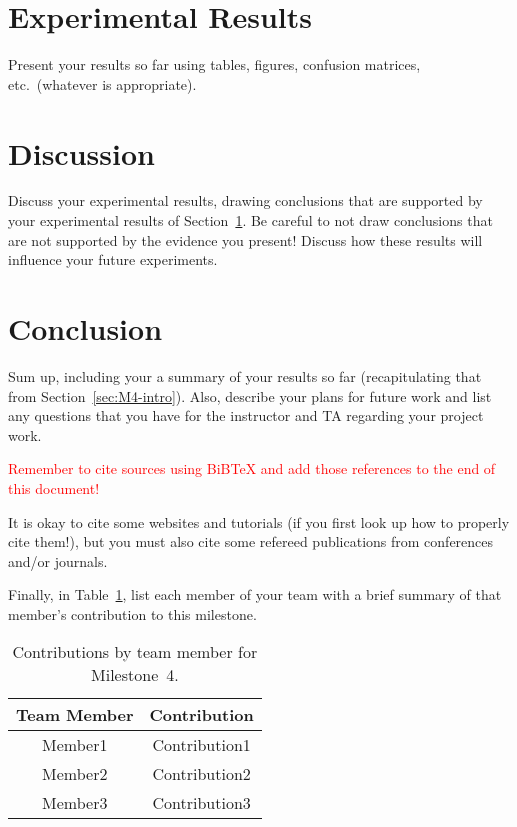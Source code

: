 \documentclass{report}
\begin{document}
\section{Experimental Results}
\label{sec:M4-results}

Present your results so far using tables, figures, confusion matrices, etc.\ (whatever is appropriate). 

\section{Discussion}

Discuss your experimental results, drawing conclusions that are supported by your experimental results of Section~\ref{sec:M4-results}.  Be careful to not draw conclusions that are not supported by the evidence you present! Discuss how these results will influence your future experiments.

\section{Conclusion}

Sum up, including your a summary of your results so far (recapitulating that from Section~\ref{sec:M4-intro}).  Also, describe your plans for future work and list any questions that you have for the instructor and TA regarding your project work.

\textcolor{red}{Remember to cite sources using BiBTeX and add those references to the end of this document!}

It is okay to cite some websites and tutorials (if you first look up how to properly cite them!), but you must also cite some refereed publications from conferences and/or journals.

Finally, in Table~\ref{tab:contribution4}, list each member of your team with a brief summary of that member's contribution to this milestone.

\begin{table}[]
    \caption{Contributions by team member for Milestone~4.}
    \centering
    \begin{tabular}{|c|c|} \hline
    {\bf Team Member}     &  {\bf Contribution}  \\ \hline
    Member1     &  Contribution1 \\
    Member2     &  Contribution2 \\
    Member3     &  Contribution3 \\ \hline
    \end{tabular}
    \label{tab:contribution4}
\end{table}
\end{document}
